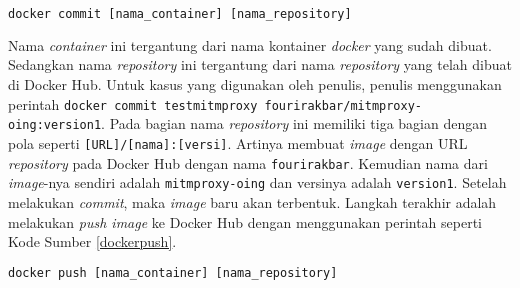 	\newline
	\begin{minipage}{\linewidth}
	\begin{lstlisting}[caption=Perintah untuk \textit{Commit} Kontainer \textit{Docker},language=Python,label=dockercommit]
	docker commit [nama_container] [nama_repository]
	\end{lstlisting}
	\end{minipage}
    Nama \textit{container} ini tergantung dari nama kontainer \textit{docker} yang sudah dibuat. Sedangkan nama \textit{repository} ini tergantung dari nama \textit{repository} yang telah dibuat di Docker Hub. Untuk kasus yang digunakan oleh penulis, penulis menggunakan perintah \texttt{docker commit testmitmproxy fourirakbar/mitmproxy-oing:version1}. Pada bagian nama \textit{repository} ini memiliki tiga bagian dengan pola seperti \texttt{[URL]/[nama]:[versi]}. Artinya membuat \textit{image} dengan URL \textit{repository} pada Docker Hub dengan nama \texttt{fourirakbar}. Kemudian nama dari \textit{image}-nya sendiri adalah \texttt{mitmproxy-oing} dan versinya adalah \texttt{version1}. Setelah melakukan \textit{commit}, maka \textit{image} baru akan terbentuk. Langkah terakhir adalah melakukan \textit{push image} ke Docker Hub dengan menggunakan perintah seperti Kode Sumber \ref{dockerpush}.
    \newline
    \begin{minipage}{\linewidth}
   	\begin{lstlisting}[caption=Perintah untuk \textit{Push Image} ke Docker Hub,language=Python,label=dockerpush]
  docker push [nama_container] [nama_repository]
   	\end{lstlisting}
    \end{minipage}
    
